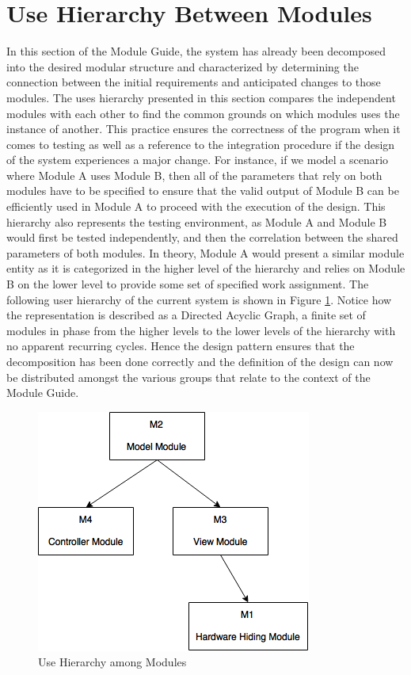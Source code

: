\documentclass{article}
\begin{document}

\section{Use Hierarchy Between Modules} \label{SecUse}

In this section of the Module Guide, the system has already been decomposed into the desired modular structure and characterized by determining the connection between the initial requirements and anticipated changes to those modules. The uses hierarchy presented in this section compares the independent modules with each other to find the common grounds on which modules uses the instance of another. This practice ensures the correctness of the program when it comes to testing as well as a reference to the integration procedure if the design of the system experiences a major change. For instance, if we model a scenario where Module A uses Module B, then all of the parameters that rely on both modules have to be specified to ensure that the valid output of Module B can be efficiently used in Module A to proceed with the execution of the design. This hierarchy also represents the testing environment, as Module A and Module B would first be tested independently, and then the correlation between the shared parameters of both modules. In theory, Module A would present a similar module entity as it is categorized in the higher level of the hierarchy and relies on Module B on the lower level to provide some set of specified work assignment. The following user hierarchy of the current system is shown in Figure \ref{FigUH}. Notice how the representation is described as a Directed Acyclic Graph, a finite set of modules in phase from the higher levels to the lower levels of the hierarchy with no apparent recurring cycles. Hence the design pattern ensures that the decomposition has been done correctly and the definition of the design can now be distributed amongst the various groups that relate to the context of the Module Guide.

\begin{figure}[H]
    \centering
    \includegraphics[width=\textwidth]{MGUsesHierarchy.png}
    \caption{Use Hierarchy among Modules}
    \label{FigUH}
\end{figure}
\end{document}
